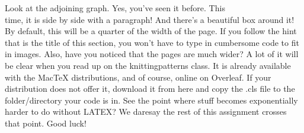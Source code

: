 \documentclass{knittingpattern}
\begin{document}
\begin{minipage}{0.1\textwidth}
\begin{figure}[H]
\setlength{\fboxsep}{17pt}
\setlength{\fboxrule}{1.5pt}
\end{figure}
\end{minipage} \hfill
\begin{minipage}{0.5\textwidth}
Look at the adjoining graph. Yes, you’ve seen it before. This \\ time, it is side by side with a paragraph! And there’s a beautiful box around it! By default, this will be a quarter of the
width of the page. If you follow the hint that is the title of this section, you won’t have to type in cumbersome code to fit in images. Also, have you noticed that the pages are much
wider? A lot of it will be clear when you read up on the knittingpatterns class. It is already available with the MacTeX distributions, and of course, online on Overleaf. If your distribution does not offer it, download it from here and copy the .cls file to the folder/directory your code is in. See the point where stuff becomes exponentially harder to do without LATEX? We daresay the rest of this assignment crosses that point. Good luck!

\end{minipage}
\newpage
\end{document}
